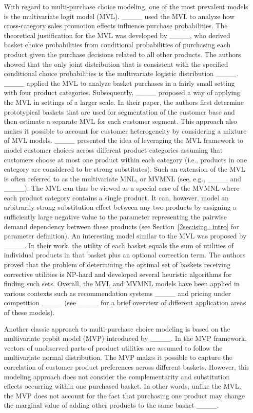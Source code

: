 With regard to multi-purchase choice modeling, one of the most prevalent models is the multivariate logit model (MVL). ____ used the MVL to analyze how cross-category sales promotion effects influence purchase probabilities.
The theoretical justification for the MVL was developed by ____, who derived basket choice probabilities from conditional probabilities of purchasing each product given the purchase decisions related to all
other products. The authors showed that the only joint distribution that is consistent with the specified conditional choice probabilities is the multivariate logistic distribution ____. ____ applied the MVL to analyze basket purchases in a fairly small setting with four product categories. Subsequently, ____ proposed a way of applying the MVL in settings of a larger scale. In their paper, the authors first determine prototypical baskets that are used for segmentation of the customer base and then estimate a separate MVL for each customer segment. 
This approach also makes it possible to account for customer heterogeneity by considering a mixture of MVL models. 
____ presented the idea of leveraging the MVL framework to model customer choices across different product categories assuming that customers choose at most one product within each category (i.e., products in one category are considered to be strong substitutes). Such an extension of the MVL is often referred to as the multivariate MNL, or MVMNL (see, e.g., ____ and ____). The MVL can thus be viewed as a special case of the MVMNL where each product category contains a single product. It can, however, model an arbitrarily strong substitution effect between any two products by assigning a sufficiently large negative value to the parameter representing the pairwise demand dependency between these products (see Section~\ref{2sec:ising_intro} for parameter definition). An interesting model similar to the MVL was proposed by ____. In their work,
the utility of each basket equals the sum of utilities of individual products in that basket plus an optional correction term. 
The authors proved that the problem of determining the optimal set of baskets receiving corrective utilities is NP-hard and developed several heuristic algorithms for finding such sets. Overall, the MVL and MVMNL models have been applied in various contexts such as recommendation systems ____ and pricing under competition ____ (see ____ for a brief overview of different application areas of these models). 

Another classic approach to multi-purchase choice modeling is based on the multivariate probit model (MVP) introduced by ____. In the MVP framework, vectors of unobserved parts of product utilities are assumed to follow the multivariate normal distribution. 
The MVP makes it possible to capture the correlation of customer product preferences across different baskets. However, this modeling approach does not consider the complementarity and substitution effects occurring within one purchased basket. In other words, unlike the MVL, the MVP does not account for the fact that purchasing one product may change the marginal value of adding other products to the same basket ____. 




